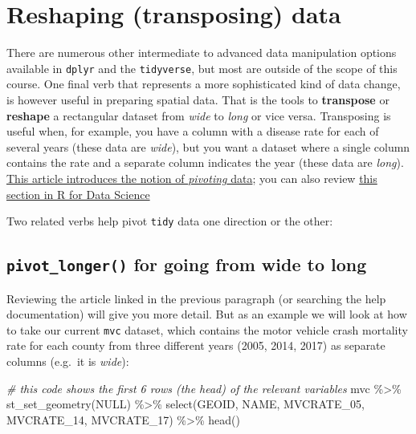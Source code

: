 \documentclass[
]{book}
\newenvironment{Shaded}{\begin{snugshade}}{\end{snugshade}}
\newcommand{\CommentTok}[1]{\textcolor[rgb]{0.56,0.35,0.01}{\textit{#1}}}
\newcommand{\ConstantTok}[1]{\textcolor[rgb]{0.00,0.00,0.00}{#1}}
\newcommand{\FunctionTok}[1]{\textcolor[rgb]{0.00,0.00,0.00}{#1}}
\newcommand{\NormalTok}[1]{#1}
\newcommand{\SpecialCharTok}[1]{\textcolor[rgb]{0.00,0.00,0.00}{#1}}
\begin{document}
\hypertarget{pivot_}{%
\section{Reshaping (transposing) data}\label{pivot_}}

There are numerous other intermediate to advanced data manipulation options available in \texttt{dplyr} and the \texttt{tidyverse}, but most are outside of the scope of this course. One final verb that represents a more sophisticated kind of data change, is however useful in preparing spatial data. That is the tools to \textbf{transpose} or \textbf{reshape} a rectangular dataset from \emph{wide} to \emph{long} or vice versa. Transposing is useful when, for example, you have a column with a disease rate for each of several years (these data are \emph{wide}), but you want a dataset where a single column contains the rate and a separate column indicates the year (these data are \emph{long}). \href{https://tidyr.tidyverse.org/articles/pivot.html}{This article introduces the notion of \emph{pivoting} data}; you can also review \href{https://r4ds.had.co.nz/tidy-data.html\#pivoting}{this section in R for Data Science}

Two related verbs help pivot \texttt{tidy} data one direction or the other:

\hypertarget{pivot_longer-for-going-from-wide-to-long}{%
\subsection{\texorpdfstring{\texttt{pivot\_longer()} for going from wide to long}{pivot\_longer() for going from wide to long}}\label{pivot_longer-for-going-from-wide-to-long}}

Reviewing the article linked in the previous paragraph (or searching the help documentation) will give you more detail. But as an example we will look at how to take our current \texttt{mvc} dataset, which contains the motor vehicle crash mortality rate for each county from three different years (2005, 2014, 2017) as separate columns (e.g.~it is \emph{wide}):

\begin{Shaded}
\begin{Highlighting}[]
\CommentTok{\# this code shows the first 6 rows (the head) of the relevant variables}
\NormalTok{mvc }\SpecialCharTok{\%\textgreater{}\%} 
  \FunctionTok{st\_set\_geometry}\NormalTok{(}\ConstantTok{NULL}\NormalTok{) }\SpecialCharTok{\%\textgreater{}\%}
  \FunctionTok{select}\NormalTok{(GEOID, NAME, MVCRATE\_05, MVCRATE\_14, MVCRATE\_17) }\SpecialCharTok{\%\textgreater{}\%}
  \FunctionTok{head}\NormalTok{()}
\end{Highlighting}
\end{Shaded}
\end{document}
